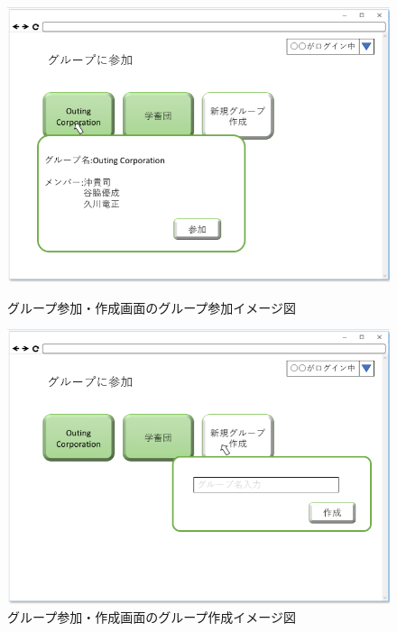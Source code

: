 \begin{figure}[htbp]
 \begin{minipage}{0.5\hsize}
  \begin{center}
   \includegraphics[width=1\linewidth,clip]{./img/26.png}
  \end{center}
  \caption{グループ参加・作成画面のグループ参加イメージ図}\label{fig:26}
 \end{minipage}
 \begin{minipage}{0.5\hsize}
  \begin{center}
   \includegraphics[width=1\linewidth,clip]{./img/27.png}
  \end{center}
  \caption{グループ参加・作成画面のグループ作成イメージ図}\label{fig:27}
 \end{minipage}
\end{figure}

